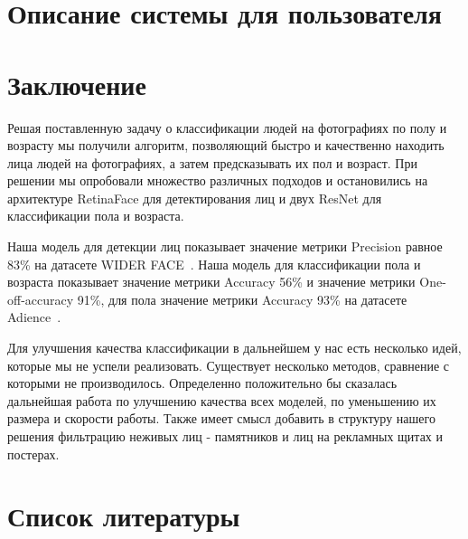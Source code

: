 \documentclass[a4paper,14pt]{extarticle}
\begin{document}
    \section{Описание системы для пользователя}\label{sec:описание-системы-для-пользователя}
    
    \newpage


    \section{Заключение}\label{sec:выводы}
    Решая поставленную задачу о классификации людей на фотографиях по полу и возрасту мы получили алгоритм,
    позволяющий быстро и качественно находить лица людей на фотографиях, а затем предсказывать их пол и возраст.
    При решении мы опробовали множество различных подходов и остановились на архитектуре RetinaFace для детектирования лиц
    и двух ResNet для классификации пола и возраста.
    \par Наша модель для детекции лиц показывает значение метрики Precision равное 83\% на датасете WIDER FACE~\cite{wider}.
    Наша модель для классификации пола и возраста показывает значение метрики Accuracy 56\% и
    значение метрики One-off-accuracy 91\%, для пола значение метрики Accuracy 93\% на датасете Adience~\cite{adience}.
    \par Для улучшения качества классификации в дальнейшем у нас есть несколько идей, которые мы не успели реализовать.
    Существует несколько методов, сравнение с которыми не производилось.
    Определенно положительно бы сказалась дальнейшая работа по улучшению качества всех моделей, по уменьшению их размера и скорости работы.
    Также имеет смысл добавить в структуру нашего решения фильтрацию неживых лиц - памятников и лиц на рекламных щитах и постерах.
    \newpage


    \section{Список литературы}\label{sec:список-литературы}
    
\end{document}
